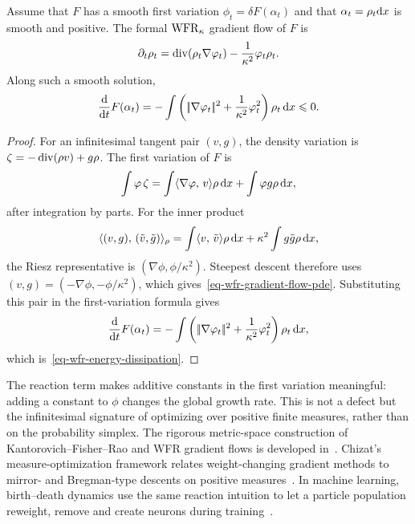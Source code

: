 \begin{proposition}\label{prop-wfr-gradient-flow-pde}
	Assume that $F$ has a smooth first variation $\phi_t=\delta F(\alpha_t)$ and that $\alpha_t=\rho_t\mathrm{d} x$ is smooth and positive. The formal $\operatorname{WFR}_\kappa$ gradient flow of $F$ is
	\begin{equation}\label{eq-wfr-gradient-flow-pde}
		\partial_t\rho_t
		=
		\operatorname{div}(\rho_t\nabla\varphi_t)
		-
		\frac{1}{\kappa^2}\varphi_t\rho_t .
	\end{equation}
	Along such a smooth solution,
	\begin{equation}\label{eq-wfr-energy-dissipation}
		\frac{\mathrm{d}}{\mathrm{d} t}F(\alpha_t)
		=
		-\int
		\left(|\!| \nabla\varphi_t |\!|^2+\frac{1}{\kappa^2}\varphi_t^2\right)\rho_t\,\mathrm{d} x
		\leqslant 0 .
	\end{equation}
\end{proposition}
\begin{proof}
	For an infinitesimal tangent pair $(v,g)$, the density variation is $\zeta=-\operatorname{div}(\rho v)+g\rho$. The first variation of $F$ is
	\[
		\int \varphi\,\zeta
		=
		\int \langle \nabla\varphi,\,v\rangle\rho\,\mathrm{d} x+\int \varphi g\rho\,\mathrm{d} x,
	\]
	after integration by parts. For the inner product
	\[
		\langle (v,g),\,(\tilde v,\tilde g)\rangle_\rho
		=
		\int \langle v,\,\tilde v\rangle\rho\,\mathrm{d} x+\kappa^2\int g\tilde g\rho\,\mathrm{d} x,
	\]
	the Riesz representative is $(\nabla\phi,\phi/\kappa^2)$. Steepest descent therefore uses $(v,g)=(-\nabla\phi,-\phi/\kappa^2)$, which gives~\eqref{eq-wfr-gradient-flow-pde}.
	Substituting this pair in the first-variation formula gives
	\[
		\frac{\mathrm{d}}{\mathrm{d} t}F(\alpha_t)
		=
		-\int
		\left(|\!| \nabla\varphi_t |\!|^2+\frac{1}{\kappa^2}\varphi_t^2\right)\rho_t\,\mathrm{d} x,
	\]
	which is~\eqref{eq-wfr-energy-dissipation}.
\end{proof}

The reaction term makes additive constants in the first variation meaningful: adding a constant to $\phi$ changes the global growth rate. This is not a defect but the infinitesimal signature of optimizing over positive finite measures, rather than on the probability simplex. The rigorous metric-space construction of Kantorovich--Fisher--Rao and WFR gradient flows is developed in~\cite{gallouet2017jko,2017-chizat-focm,2015-chizat-unbalanced}. Chizat's measure-optimization framework relates weight-changing gradient methods to mirror- and Bregman-type descents on positive measures~\cite{Chizat2019SparseOptimization,Chizat2021GradientMethodsMeasures}. In machine learning, birth--death dynamics use the same reaction intuition to let a particle population reweight, remove and create neurons during training~\cite{Rotskoff2019BirthDeath}.

